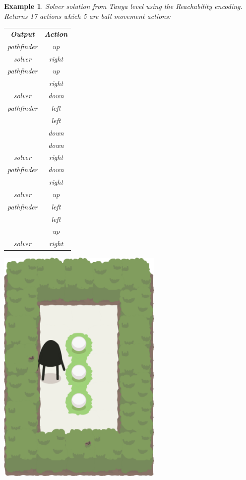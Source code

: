 \documentclass{report}
\theoremstyle{plain}
\newtheorem{example}{Example}[section]
\begin{document}
\begin{example}\label{ex:tanyareach}
Solver solution from Tanya level using the \emph{Reachability encoding}. Returns 17 actions which 5 are ball movement actions:

\vspace{1\baselineskip}

\begin{minipage}{0.5\textwidth}
\centering
\begin{tabular}{c|c|}
    \cline{1-2}
    \multicolumn{1}{|c|}{\textbf{Output}} & \textbf{Action} \\
    \cline{1-2}
	\multicolumn{1}{|c|}{pathfinder} & up \\
	\cline{1-2}
	\multicolumn{1}{|c|}{solver} & right \\
	\cline{1-2}
	\multicolumn{1}{|c|}{pathfinder} & up \\
	\cline{1-1}
	 & right \\
	\cline{1-2}
	\multicolumn{1}{|c|}{solver} & down \\
	\cline{1-2}
	\multicolumn{1}{|c|}{pathfinder} & left \\
	\cline{1-1}
	 & left \\
	 & down \\
	 & down \\
	 \cline{1-2}
	\multicolumn{1}{|c|}{solver} & right \\
	\cline{1-2}
	\multicolumn{1}{|c|}{pathfinder} & down \\
	\cline{1-1}
	 & right \\
	\cline{1-2}
	\multicolumn{1}{|c|}{solver} & up \\
	\cline{1-2}
	\multicolumn{1}{|c|}{pathfinder} & left \\
	\cline{1-1}
	 & left \\
	 & up \\
	\cline{1-2}
	\multicolumn{1}{|c|}{solver} & right \\
	\cline{1-2}
\end{tabular}
\end{minipage}
\begin{minipage}{0.5\textwidth}
\centering
\includegraphics[width=0.6\textwidth]{tanya-1.png}

\end{minipage}
\end{example}
\end{document}
